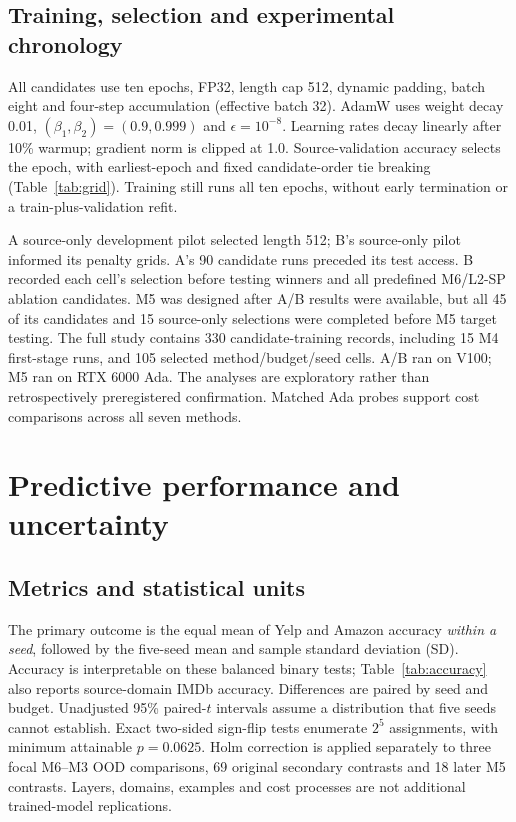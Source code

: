 \documentclass[a4paper,10pt]{article}
\begin{document}
\subsection{Training, selection and experimental chronology}
All candidates use ten epochs, FP32, length cap 512, dynamic padding, batch eight and four-step accumulation (effective batch 32). AdamW uses weight decay 0.01, $(\beta_1,\beta_2)=(0.9,0.999)$ and $\epsilon=10^{-8}$. Learning rates decay linearly after 10\% warmup; gradient norm is clipped at 1.0. Source-validation accuracy selects the epoch, with earliest-epoch and fixed candidate-order tie breaking (Table~\ref{tab:grid}). Training still runs all ten epochs, without early termination or a train-plus-validation refit.

\begin{center}

\label{tab:grid}
\end{center}
A source-only development pilot selected length 512; B's source-only pilot informed its penalty grids. A's 90 candidate runs preceded its test access. B recorded each cell's selection before testing winners and all predefined M6/L2-SP ablation candidates. M5 was designed after A/B results were available, but all 45 of its candidates and 15 source-only selections were completed before M5 target testing. The full study contains 330 candidate-training records, including 15 M4 first-stage runs, and 105 selected method/budget/seed cells. A/B ran on V100; M5 ran on RTX 6000 Ada. The analyses are exploratory rather than retrospectively preregistered confirmation. Matched Ada probes support cost comparisons across all seven methods.

\clearpage
\section{Predictive performance and uncertainty}\label{sec:accuracy}
\subsection{Metrics and statistical units}
The primary outcome is the equal mean of Yelp and Amazon accuracy \emph{within a seed}, followed by the five-seed mean and sample standard deviation (SD). Accuracy is interpretable on these balanced binary tests; Table~\ref{tab:accuracy} also reports source-domain IMDb accuracy. Differences are paired by seed and budget. Unadjusted 95\% paired-$t$ intervals assume a distribution that five seeds cannot establish. Exact two-sided sign-flip tests enumerate $2^5$ assignments, with minimum attainable $p=0.0625$. Holm correction is applied separately to three focal M6--M3 OOD comparisons, 69 original secondary contrasts and 18 later M5 contrasts. Layers, domains, examples and cost processes are not additional trained-model replications.
\end{document}
